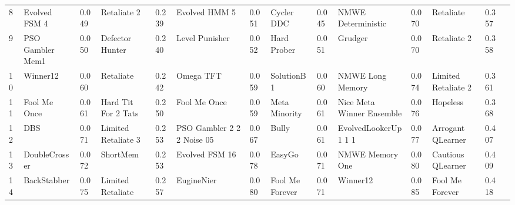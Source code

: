 \begin{tabular}{lggllggllggllr}
8  &            Evolved FSM 4 &     0.049 &            Retaliate 2 &     0.239 &               Evolved HMM 5 &     0.051 &         Cycler DDC &     0.045 &         NMWE Deterministic &     0.070 &            Retaliate &     0.357 \\
9  &         PSO Gambler Mem1 &     0.050 &        Defector Hunter &     0.240 &              Level Punisher &     0.052 &        Hard Prober &     0.051 &                    Grudger &     0.070 &          Retaliate 2 &     0.358 \\
10 &                 Winner12 &     0.060 &              Retaliate &     0.242 &                   Omega TFT &     0.059 &         SolutionB1 &     0.060 &           NMWE Long Memory &     0.074 &  Limited Retaliate 2 &     0.361 \\
11 &             Fool Me Once &     0.061 &    Hard Tit For 2 Tats &     0.250 &                Fool Me Once &     0.059 &      Meta Minority &     0.061 &  Nice Meta Winner Ensemble &     0.076 &             Hopeless &     0.368 \\
12 &                      DBS &     0.071 &    Limited Retaliate 3 &     0.253 &  PSO Gambler 2 2 2 Noise 05 &     0.067 &              Bully &     0.061 &       EvolvedLookerUp1 1 1 &     0.077 &    Arrogant QLearner &     0.407 \\
13 &            DoubleCrosser &     0.072 &               ShortMem &     0.253 &              Evolved FSM 16 &     0.078 &             EasyGo &     0.071 &            NMWE Memory One &     0.080 &    Cautious QLearner &     0.409 \\
14 &              BackStabber &     0.075 &      Limited Retaliate &     0.257 &                  EugineNier &     0.080 &    Fool Me Forever &     0.071 &                   Winner12 &     0.085 &      Fool Me Forever &     0.418 \\
\bottomrule
\end{tabular}
